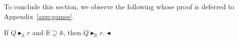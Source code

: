 \documentclass{lipics-v2021}
\newcommand{\fillBox}{\hfill$\blacktriangleleft$}
\newcommand{\wstrat}[1]{\blacktriangleright_{#1}}            %
\newcommand{\arena}[1]{\mathbb{#1}}                     %
\begin{document}
To conclude this section, we observe the following whose proof is deferred to Appendix~\ref{app:games}.
\begin{lemma}[Monotonicity]
\label{lem:monotonicity}
    If $Q \wstrat{\arena{A}} r$ and $\arena{B} \supseteq \arena{A}$, then $Q \wstrat{\arena{B}} r$. \fillBox
\end{lemma}
%
%
\end{document}
